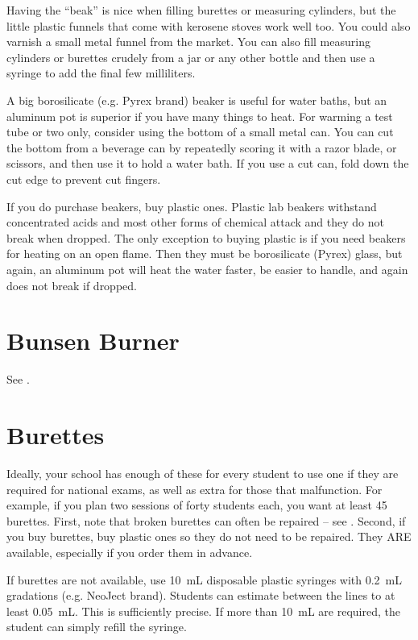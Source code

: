 Having the ``beak'' is nice when filling burettes or measuring cylinders, 
but the little plastic funnels that come with kerosene stoves work well too. 
You could also varnish a small metal funnel from the market. 
You can also fill measuring cylinders or burettes crudely 
from a jar or any other bottle 
and then use a syringe to add the final few milliliters.

A big borosilicate (e.g. 
Pyrex brand) beaker is useful for water baths, 
but an aluminum pot is superior if you have many things to heat. 
For warming a test tube or two only, 
consider using the bottom of a small metal can. 
You can cut the bottom from a beverage can 
by repeatedly scoring it with a razor blade, 
or scissors, 
and then use it to hold a water bath. 
If you use a cut can, 
fold down the cut edge to prevent cut fingers.

If you do purchase beakers, 
buy plastic ones. 
Plastic lab beakers withstand concentrated acids 
and most other forms of chemical attack 
and they do not break when dropped. 
The only exception to buying plastic is 
if you need beakers for heating on an open flame. 
Then they must be borosilicate (Pyrex) glass, 
but again, 
an aluminum pot will heat the water faster, 
be easier to handle, 
and again does not break if dropped.

\section{Bunsen Burner}
\label{sec:bunsen-burner}
See .

\section{Burettes}
\label{sec:burettes}
Ideally, 
your school has enough of these for every student 
to use one if they are required for national exams, 
as well as extra for those that malfunction. 
For example, 
if you plan two sessions of forty students each, 
you want at least 45 burettes. 
First, 
note that broken burettes can often be repaired -- 
see . 
Second, 
if you buy burettes, 
buy plastic ones so they do not need to be repaired. 
They ARE available, 
especially if you order them in advance.

If burettes are not available, 
use 10~mL disposable plastic syringes with 0.2~mL gradations (e.g. 
NeoJect brand). 
Students can estimate between the lines to at least 0.05~mL. 
This is sufficiently precise. 
If more than 10~mL are required, 
the student can simply refill the syringe.

